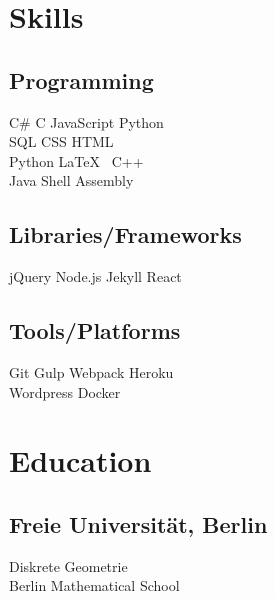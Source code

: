 \documentclass[]{plushcv}
\begin{document}
\begin{minipage}[t]{0.25\textwidth} 


\section{Skills}
\subsection{Programming}
\sectionsep
{}
C\# \textbullet{} C \textbullet{} JavaScript \textbullet{} Python    \\ SQL \textbullet{} CSS \textbullet{} HTML \textbullet{} \\
\sectionsep
{}
Python \textbullet{} \LaTeX\ \textbullet{}  C++  \\
\sectionsep
{}
Java \textbullet{}  Shell \textbullet{} Assembly \\
\sectionsep
\sectionsep
\subsection{Libraries/Frameworks}
\sectionsep
jQuery \textbullet{} Node.js \textbullet{} Jekyll \textbullet{} React \\
\sectionsep
\sectionsep
\subsection{Tools/Platforms}
\sectionsep
Git \textbullet{} Gulp \textbullet{} Webpack \textbullet{} Heroku    \\ Wordpress \textbullet{} Docker \\

\sectionsep


\section{Education} 
\subsection{Freie Universität, Berlin}
Diskrete Geometrie\\ Berlin Mathematical School


\end{minipage}
\end{document}
